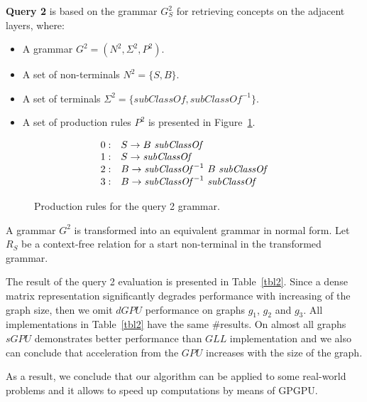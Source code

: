 \textbf{Query 2} is based on the grammar $G^2_S$ for retrieving concepts on the adjacent layers, where:
\begin{itemize}
    \item A grammar $G^2 = (N^2, \Sigma^2, P^2)$.
    \item A set of non-terminals $N^2 = \{S, B\}$.
    \item A set of terminals $\Sigma^2 = \{subClassOf, subClassOf^{-1}\}$.
    \item A set of production rules $P^2$ is presented in Figure~\ref{ProductionRulesQuery2}.
\end{itemize}

\begin{figure}[h]
   \[
\begin{array}{rl}
   0: & S \rightarrow B \ \text{\textit{subClassOf}} \\ 
   1: & S \rightarrow \text{\textit{subClassOf}} \\ 
   2: & B \rightarrow \text{\textit{subClassOf}}^{-1} \ B \ \text{\textit{subClassOf}} \\ 
   3: & B \rightarrow \text{\textit{subClassOf}}^{-1} \ \text{\textit{subClassOf}} \\ 
\end{array}
\]
\caption{Production rules for the query 2 grammar.}
\label{ProductionRulesQuery2}
\end{figure}

A grammar $G^2$ is transformed into an equivalent grammar in normal form. Let $R_S$ be a context-free relation for a start non-terminal in the transformed grammar.

The result of the query 2 evaluation is presented in Table~\ref{tbl2}. Since a dense matrix representation significantly degrades performance with increasing of the graph size, then we omit $dGPU$ performance on graphs $g_1$, $g_2$ and $g_3$. All implementations in Table~\ref{tbl2} have the same \#results. On almost all graphs $sGPU$ demonstrates better performance than $GLL$ implementation and we also can conclude that acceleration from the $GPU$ increases with the size of the graph.

As a result, we conclude that our algorithm can be applied to some real-world problems and it allows to speed up computations by means of GPGPU.

